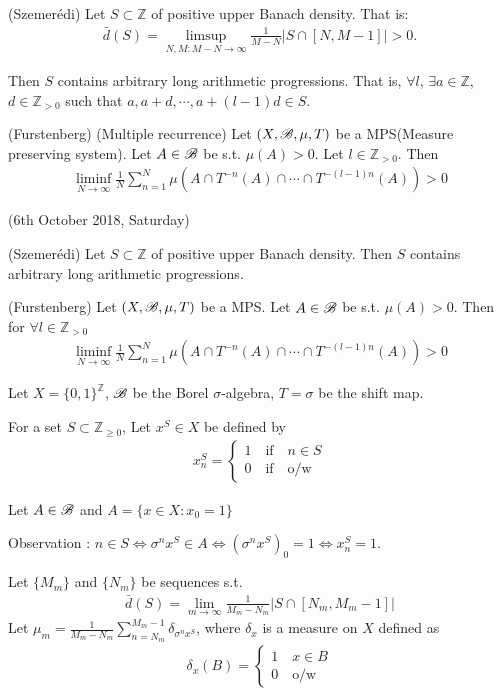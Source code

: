 \documentclass[12pt,a4paper]{report}
\begin{document}
\thm (Szemer\'{e}di) Let $S \subset \mathbb{Z}$ of positive upper Banach density. That is:
\begin{align*}
\bar{d}(S) = \limsup_{N,M : M-N \rightarrow \infty} \frac{1}{M-N}|S \cap [N,M-1] | >0.
\end{align*}

Then $S$ contains arbitrary long arithmetic progressions. That is, $\forall l$, $\exists a \in \mathbb{Z}$, $d\in \mathbb{Z}_{>0}$ such that $a, a+d, \cdots, a+(l-1)d \in S$.
\s

\thm (Furstenberg) (Multiple recurrence) Let $(X,\mathscr{B},\mu, T)$ be a MPS(Measure preserving system). Let $A \in \mathscr{B}$ be s.t. $\mu(A) >0$. Let $l\in \mathbb{Z}_{>0}$. Then
\begin{align*}
\liminf_{N\rightarrow \infty} \frac{1}{N} \sum_{n=1}^N \mu(A\cap T^{-n}(A) \cap \cdots \cap T^{-(l-1)n}(A))>0
\end{align*}
\s

\newday

(6th October 2018, Saturday)
\s

\thm (Szemer\'{e}di) Let $S \subset \mathbb{Z}$ of positive upper Banach density. Then $S$ contains arbitrary long arithmetic progressions. \s

\thm (Furstenberg) Let $(X,\mathscr{B},\mu, T)$ be a MPS. Let $A \in \mathscr{B}$ be s.t. $\mu(A) >0$. Then for $\forall l\in \mathbb{Z}_{>0}$
\begin{align*}
\liminf_{N\rightarrow \infty} \frac{1}{N} \sum_{n=1}^N \mu(A\cap T^{-n}(A) \cap \cdots \cap T^{-(l-1)n}(A))>0
\end{align*}
\s
\s

Let $X =\{0,1\}^{\mathbb{Z}}$, $\mathscr{B}$ be the Borel $\sigma$-algebra, $T=\sigma$ be the shift map.

For a set $S \subset \mathbb{Z}_{\geq 0}$, Let $x^S \in X$ be defined by
\begin{align*}
x_n^S =\begin{cases}
1 \quad \text{if} \quad n\in S\\
0 \quad \text{if} \quad \text{o/w} 
\end{cases}
\end{align*}

Let $A \in \mathscr{B}$ and $A = \{x\in X:x_0=1 \}$

Observation : $n\in S \Leftrightarrow \sigma^n x^S \in A \Leftrightarrow (\sigma^n x^S)_0=1 \Leftrightarrow x_n^S =1$.

Let $\{M_m\}$ and $\{N_m\}$ be sequences s.t.
\begin{align*}
\bar{d}(S) = \lim_{m\rightarrow \infty} \frac{1}{M_m - N_m} \big|S \cap [N_m,M_m-1] \big|
\end{align*}
Let $\mu_m = \frac{1}{M_m - N_m} \sum_{n=N_m}^{M_m-1} \delta_{\sigma^n x^S}$, where $\delta_x$ is a measure on $X$ defined as
\begin{align*}
\delta_x(B) = \begin{cases}
1 \quad x\in B \\
0 \quad \text{o/w}
\end{cases}
\end{align*}
\end{document}
